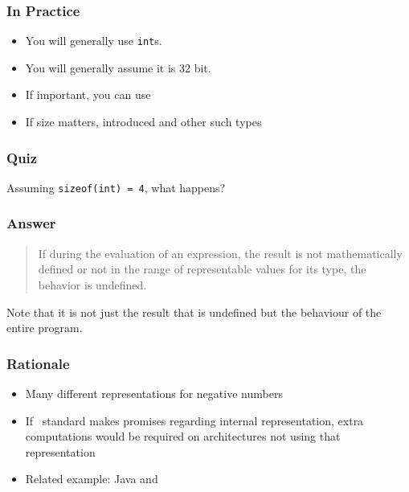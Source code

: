 \begin{frame}
  \frametitle{In Practice}
  \begin{itemize}
    \item You will generally use {\tt int}s.
    \item You will generally assume it is 32 bit.
    \item If important, you can use 
    \item If size matters,  introduced  and other such types
  \end{itemize}
\end{frame}

\begin{frame}
  \frametitle{Quiz}
  \begin{center}
    \Large Assuming {\tt sizeof(int) = 4}, what happens?
  \end{center}
\end{frame}

\begin{frame}
  \frametitle{Answer}
  \begin{quote}
    If during the evaluation of an expression, the result is not mathematically defined or not in the range of
    representable values for its type, the behavior is undefined. \\
    \hfill {}
  \end{quote}
  \vskip5mm
  Note that it is not just the result that is undefined but the behaviour of the entire program.
\end{frame}

\begin{frame}
  \frametitle{Rationale}
  \begin{itemize}
    \item Many different representations for negative numbers
    \item If \cpp\ standard makes promises regarding internal representation,
          extra computations would be required on architectures not using that representation
    \item Related example: Java and 
  \end{itemize}
\end{frame}

